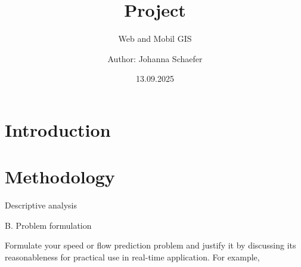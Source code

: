 



\title{Project}
\subtitle{Web and Mobil GIS}
\author{Author: Johanna Schaefer}
\date{13.09.2025}
\maketitle
\vspace{3cm}

\thispagestyle{empty}	%


\thispagestyle{empty}


 
\thispagestyle{empty}
\cleardoublepage
\thispagestyle{empty}
\newpage

\setcounter{page}{1}	%

\section{Introduction}


\section{Methodology}
Descriptive analysis  


B. Problem formulation  

Formulate your speed or flow prediction problem and justify it by discussing its reasonableness for practical use in real-time application. For example,   

